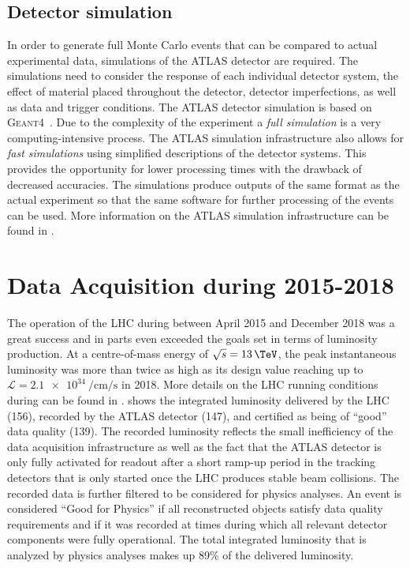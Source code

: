 \subsection{Detector simulation}
In order to generate full Monte Carlo events that can be compared to actual experimental data, simulations of the ATLAS detector are required.
The simulations need to consider the response of each individual detector system, the effect of material placed throughout the detector, detector imperfections, as well as data and trigger conditions.
The ATLAS detector simulation is based on \textsc{Geant4}~\cite{Agostinelli:2002hh}.
Due to the complexity of the experiment a \emph{full simulation} is a very computing-intensive process. The ATLAS simulation infrastructure also allows for \emph{fast simulations} using simplified descriptions of the detector systems. This provides the opportunity for lower processing times with the drawback of decreased accuracies.
The simulations produce outputs of the same format as the actual experiment so that the same software for further processing of the events can be used.
More information on the ATLAS simulation infrastructure can be found in .



\section{Data Acquisition during 2015-2018}
\label{sec:run-2-data-taking}

The operation of the LHC during \RunTwo between April 2015 and December 2018 was a great success and in parts even exceeded the goals set in terms of luminosity production. At a centre-of-mass energy of $\sqrt{s} = 13\,\TeV$, the peak instantaneous luminosity was more than twice as high as its design value reaching up to $\mathcal{L} = \SI{2.1e34}{\per\cm\per\s}$ in 2018. More details on the LHC running conditions during \RunTwo can be found in .
 shows the integrated luminosity delivered by the LHC (156\ifb), recorded by the ATLAS detector (147\ifb), and certified as being of ``good'' data quality (139\ifb).
The recorded luminosity reflects the small inefficiency of the data acquisition infrastructure as well as the fact that the ATLAS detector is only fully activated for readout after a short ramp-up period in the tracking detectors that is only started once the LHC produces stable beam collisions.
The recorded data is further filtered to be considered for physics analyses.
An event is considered ``Good for Physics'' if all reconstructed objects satisfy data quality requirements and if it was recorded at times during which all relevant detector components were fully operational.
The total integrated luminosity that is analyzed by physics analyses makes up 89\% of the delivered luminosity.

